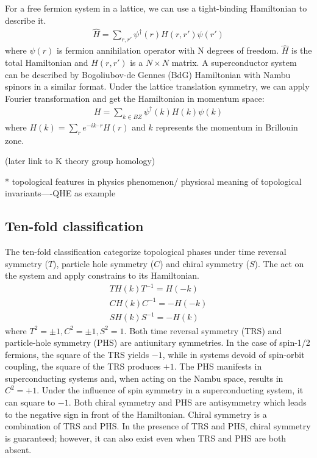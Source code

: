 For a free fermion system in a lattice, we can use a tight-binding Hamiltonian to describe it. 
\begin{align}
\hat{H}=\sum_{r,r'}\psi^\dagger(r)H(r,r')\psi(r')
\end{align}
where $\psi(r)$ is fermion annihilation operator with N degrees of freedom. $\hat{H}$ is the total Hamiltonian and $H(r,r')$ is a $N\times N$ matrix. A superconductor system can be described by Bogoliubov-de Gennes (BdG) Hamiltonian with Nambu spinors in a similar format. Under the lattice translation symmetry, we can apply Fourier transformation and get the Hamiltonian in momentum space: 
\begin{align}
\label{eq:HK}
    H = \sum_{k\in BZ}\psi^\dagger(k) H(k)\psi(k)
\end{align}
where $H(k) = \sum_re^{-ik\cdot r}H(r)$ and $k$ represents the momentum in Brillouin zone. 


(later link to K theory group homology)


*  topological features in physics phenomenon/ physicsal meaning of topological invariants----QHE as example
\subsection{Ten-fold classification}

The ten-fold classification categorize topological phases under time reversal symmetry ($T$), particle hole symmetry ($C$) and chiral symmetry ($S$). The act on the system and apply constrains to its Hamiltonian.
\begin{align}
\label{eq:TCS}
    TH(k)T^{-1} = H(-k)\\
    CH(k)C^{-1} = -H(-k)\\
    SH(k)S^{-1} = -H(k)
\end{align}
where $T^{2} = \pm 1, C^2 = \pm 1, S^2 = 1$. Both time reversal symmetry (TRS) and particle-hole symmetry (PHS) are antiunitary symmetries. In the case of spin-1/2 fermions, the square of the TRS yields $-1$, while in systems devoid of spin-orbit coupling, the square of the TRS produces $+1$. The PHS manifests in superconducting systems and, when acting on the Nambu space, results in $C^2 = +1$. Under the influence of spin symmetry in a superconducting system, it can square to $-1$. Both chiral symmetry and PHS are antisymmetry which leads to the negative sign in front of the Hamiltonian. Chiral symmetry is a combination of TRS and PHS.  In the presence of TRS and PHS, chiral symmetry is guaranteed; however, it can also exist even when TRS and PHS are both absent.


